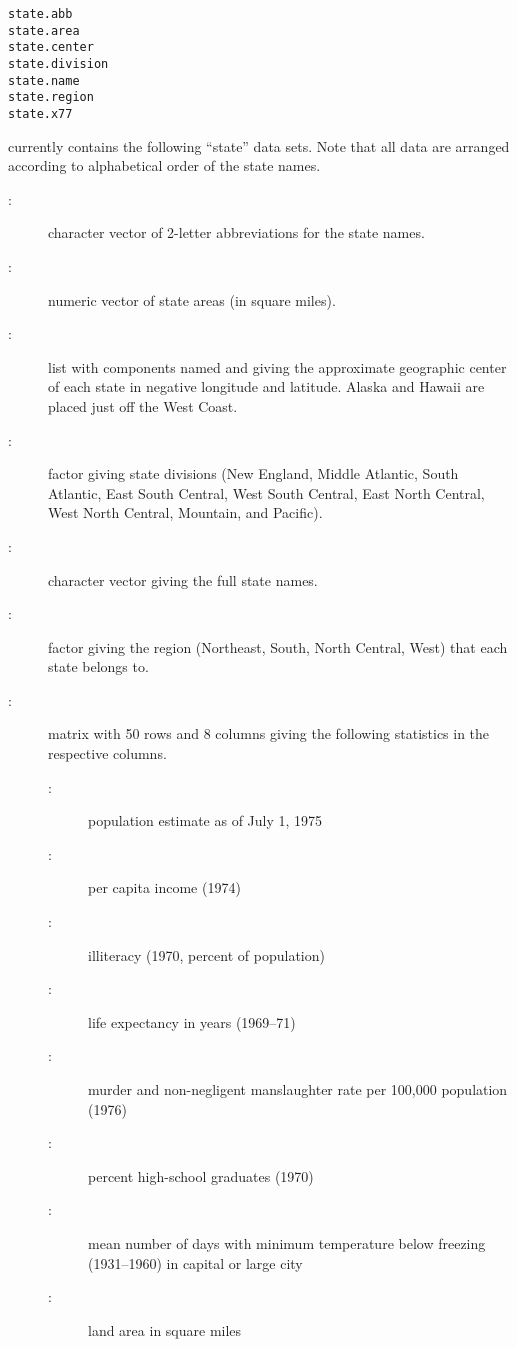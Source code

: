 %
\begin{Usage}
\begin{verbatim}
state.abb
state.area
state.center
state.division
state.name
state.region
state.x77
\end{verbatim}
\end{Usage}
%
\begin{Details}\relax
\R{} currently contains the following ``state'' data sets.  Note
that all data are arranged according to alphabetical order of the
state names.
\begin{description}

\item[:] character vector of 2-letter abbreviations
for the state names.
\item[:] numeric vector of state areas (in square
miles).
\item[:]  list with components named  and
 giving the approximate geographic center of each state in
negative longitude and latitude.  Alaska and Hawaii are placed
just off the West Coast.
\item[:] factor giving state divisions (New
England, Middle Atlantic, South Atlantic, East South Central, West
South Central, East North Central, West North Central, Mountain,
and Pacific).
\item[:] character vector giving the full state
names.
\item[:] factor giving the region (Northeast,
South, North Central, West) that each state belongs to.
\item[:] matrix with 50 rows and 8 columns giving
the following statistics in the respective columns.
\begin{description}

\item[:] population estimate as of July 1,
1975
\item[:] per capita income (1974)
\item[:] illiteracy (1970, percent of
population)
\item[:] life expectancy in years (1969--71)
\item[:] murder and non-negligent manslaughter rate
per 100,000 population (1976)
\item[:] percent high-school graduates (1970)
\item[:] mean number of days with minimum
temperature below freezing (1931--1960) in capital or large
city
\item[:] land area in square miles

\end{description}


\end{description}

\end{Details}
